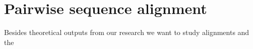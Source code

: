 \section{Pairwise sequence alignment}

Besides theoretical outputs from our research we want to study alignments  and
the 

\label{LastPage}

%
%
%

